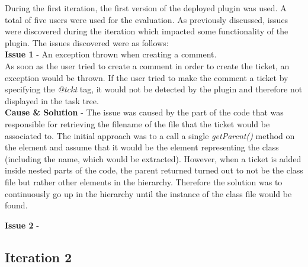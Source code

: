 \documentclass{4thYearProject}
\begin{document}
During the first iteration, the first version of the deployed plugin was used. A total of five users were used for the evaluation. As previously discussed, issues were discovered during the iteration which impacted some functionality of the plugin. 
\newline
The issues discovered were as follows:\\
\newline
\textbf{Issue 1} - An exception thrown when creating a comment.\\
\newline
As soon as the user tried to create a comment in order to create the ticket, an exception would be thrown. If the user tried to make the comment a ticket by specifying the \textit{@tckt} tag, it would not be detected by the plugin and therefore not displayed in the task tree.\\   
\newline
\textbf{Cause \& Solution} - The issue was caused by the part of the code that was responsible for retrieving the filename of the file that the ticket would be associated to. The initial approach was to a call a single \textit{getParent()} method on the element and assume that it would be the element representing the class (including the name, which would be extracted). However, when a ticket is added inside nested parts of the code, the parent returned turned out to not be the class file but rather other elements in the hierarchy. Therefore the solution was to continuously go up in the hierarchy until the instance of the class file would be found. 

\textbf{Issue 2} - %
	

\subsection{Iteration 2}
\end{document}
